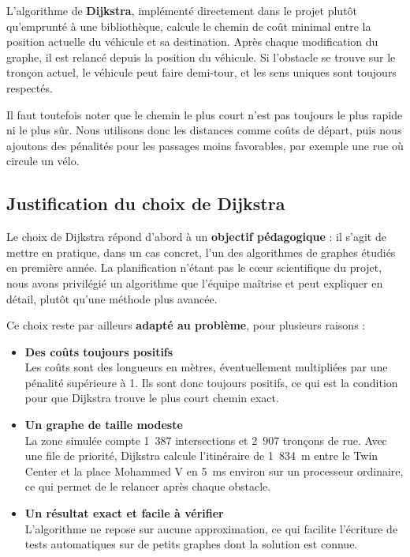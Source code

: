 L'algorithme de \textbf{Dijkstra}, implémenté directement dans le projet plutôt qu'emprunté à une bibliothèque, calcule le chemin de coût minimal entre la position actuelle du véhicule et sa destination. Après chaque modification du graphe, il est relancé depuis la position du véhicule. Si l'obstacle se trouve sur le tronçon actuel, le véhicule peut faire demi-tour, et les sens uniques sont toujours respectés.

Il faut toutefois noter que le chemin le plus court n'est pas toujours le plus rapide ni le plus sûr. Nous utilisons donc les distances comme coûts de départ, puis nous ajoutons des pénalités pour les passages moins favorables, par exemple une rue où circule un vélo.

\subsection{Justification du choix de Dijkstra}

Le choix de Dijkstra répond d'abord à un \textbf{objectif pédagogique} : il s'agit de mettre en pratique, dans un cas concret, l'un des algorithmes de graphes étudiés en première année. La planification n'étant pas le cœur scientifique du projet, nous avons privilégié un algorithme que l'équipe maîtrise et peut expliquer en détail, plutôt qu'une méthode plus avancée.

Ce choix reste par ailleurs \textbf{adapté au problème}, pour plusieurs raisons :

\begin{itemize}
  \item \textbf{Des coûts toujours positifs}\\
  Les coûts sont des longueurs en mètres, éventuellement multipliées par une pénalité supérieure à 1. Ils sont donc toujours positifs, ce qui est la condition pour que Dijkstra trouve le plus court chemin exact.
  \item \textbf{Un graphe de taille modeste}\\
  La zone simulée compte 1~387 intersections et 2~907 tronçons de rue. Avec une file de priorité, Dijkstra calcule l'itinéraire de 1~834~m entre le Twin Center et la place Mohammed V en 5~ms environ sur un processeur ordinaire, ce qui permet de le relancer après chaque obstacle.
  \item \textbf{Un résultat exact et facile à vérifier}\\
  L'algorithme ne repose sur aucune approximation, ce qui facilite l'écriture de tests automatiques sur de petits graphes dont la solution est connue.
\end{itemize}

